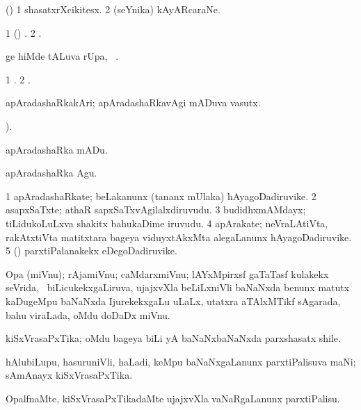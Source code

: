 \bentry
{}
\gl{\nA}
\bmng
(\AmA) 
\bnum
\num{1} shasatxrXcikitesx. 
\num{2} (seYnika) kAyARcaraNe. 
\enum
\emng
\eentry

\bentry
{}
\gl{\saMkiSx}
\bmng
\bnum
\num{1} (\saM) . 
\num{2} . 
\enum
\emng
\eentry

\bentry
{}
\gl{\pUparx}
\bmng
{}ge hiMde  tALuva rUpa, \udA\ . 
\emng
\eentry

\bentry
{}
\gl{\saMkiSx}
\bmng
\bnum
\num{1} . 
\num{2} . 
\enum
\emng
\eentry

\bentry
{}
\gl{\nA}
\bmng
apAradashaRkakAri; apAradashaRkavAgi mADuva vasutx. 
\emng
\eentry

\bentry
{}
\gl{\kirxvi}
 ). 

\noindent
\gl{\sakirx}
\bmng
apAradashaRka mADu. 
\emng

\noindent
\gl{\akirx}
\bmng
apAradashaRka Agu. 
\emng
\eentry

\bentry
{}
\gl{\nA}
\bmng
\bnum
\num{1} apAradashaRkate; beLakanunx (tananx mUlaka) hAyagoDadiruvike. 
\num{2} asapxSaTxte; athaR sapxSaTxvAgilalxdiruvudu. 
\num{3} budidhxmAMdayx; tiLidukoLuLxva shakitx bahukaDime iruvudu. 
\num{4} apArakate; neVraLAtiVta, rakAtxtiVta matitxtara bageya viduyxtAkxMta alegaLanunx hAyagoDadiruvike. 
\num{5} (\viparx) parxtiPalanakekx eDegoDadiruvike. 
\enum
\emng
\eentry

\bentry
{}
\gl{\nA}
\bmng
Opa (miVnu); rAjamiVnu; caMdarxmiVnu; lAYxMpirxsf gaTaTasf kulakekx seVrida, \sA\ biLicukekxgaLiruva, ujajxvXla beLiLxniVli baNaNxda benunx matutx kaDugeMpu baNaNxda IjurekekxgaLu uLaLx, utatxra aTAlxMTikf sAgarada, bahu viraLada, oMdu doDaDx miVnu. 
\emng
\eentry

\bentry
{}
\gl{\nA}
\bmng
kiSxVrasaPxTika; oMdu bageya biLi yA baNaNxbaNaNxda parxshasatx shile. 
\emng

\noindent
\gl{\pagu}
\bmng
{} hAlubiLupu, hasuruniVli, haLadi, keMpu baNaNxgaLanunx parxtiPalisuva maNi; sAmAnayx kiSxVrasaPxTika. 
\emng
\eentry

\bentry
{}
\gl{\akirx}
\bmng
OpalfnaMte, kiSxVrasaPxTikadaMte ujajxvXla vaNaRgaLanunx parxtiPalisu. 
\emng
\eentry

